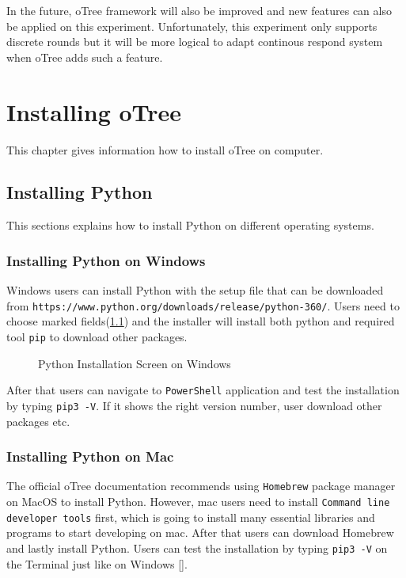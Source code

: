 In the future, oTree framework will also be improved and new features can also be applied on this experiment. Unfortunately, this experiment only supports discrete rounds but it will be more logical to adapt continous respond system when oTree adds such a feature.

\begin{appendix} \label{anhang}
	
\chapter{Installing oTree} \label{anhang1}

This chapter gives information how to install oTree on computer.

\section{Installing Python}

This sections explains how to install Python on different operating systems. 

\subsection{Installing Python on Windows}

Windows users can install Python with the setup file that can be downloaded from \verb|https://www.python.org/downloads/release/python-360/|. Users 
need to choose marked fields(\ref{fig:picture1}) and the installer will install both python and required tool \verb|pip| to download other packages.

\begin{figure}[h]
	\centerline{}
	\caption{Python Installation Screen on Windows}
	\label{fig:picture1}
\end{figure}


After that users can navigate to  \verb|PowerShell| application and test the installation by typing  \verb|pip3 -V|. If it shows the right version number, user download other packages etc.


\subsection{Installing Python on Mac}

The official oTree documentation recommends using \verb|Homebrew| package manager on MacOS to install Python. However, mac users need to install \verb|Command line developer tools| first, which is going to install many essential libraries and programs to start developing on mac. After that users can download Homebrew and lastly install Python. Users can test the installation by typing \verb|pip3 -V| on the Terminal just like on Windows [\cite{oTreeInstall2017}].


\end{appendix}
